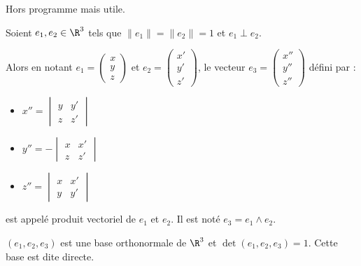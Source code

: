 
\lvspace
\avspace 

\begin{exemple}
    Hors programme mais utile. 

    Soient $e_1, e_2 \in \R^3$ tels que $\|e_1\| = \|e_2\| = 1$ et $e_1 \perp e_2$. 

    Alors en notant $e_1 = \begin{pmatrix}
        x \\ y \\ z
    \end{pmatrix}$ et $e_2 = \begin{pmatrix}
        x' \\ y' \\ z'
        \end{pmatrix}$, le vecteur $e_3 = \begin{pmatrix}
            x'' \\ y'' \\ z''
        \end{pmatrix}$ défini par : 
    \begin{itemize}
        \item $x'' = \begin{vmatrix}
            y & y' \\ z & z'
        \end{vmatrix}$
        \item $y'' = - \begin{vmatrix}
            x & x' \\ z & z'
        \end{vmatrix}$
        \item $z'' = \begin{vmatrix}
            x & x' \\ y & y'
        \end{vmatrix}$
    \end{itemize}

    est appelé produit vectoriel de $e_1$ et $e_2$. Il est noté $e_3 = e_1 \wedge e_2$.

    $(e_1, e_2, e_3)$ est une base orthonormale de $\R^3$ et $\det (e_1, e_2, e_3) = 1$. 
    Cette base est dite directe.
\end{exemple}

